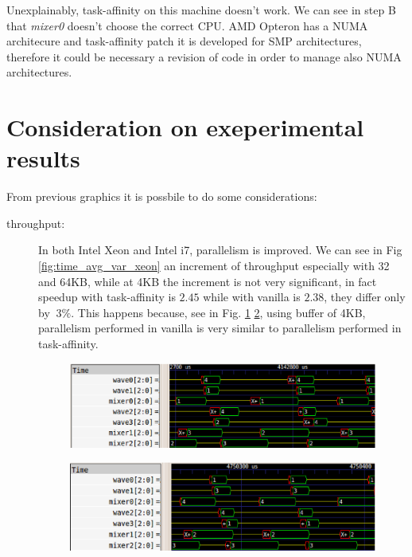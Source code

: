 Unexplainably, task-affinity on this machine doesn't work. We can see in step B that \textit{mixer0} doesn't choose the correct CPU. AMD Opteron has a NUMA 
architecure and task-affinity patch it is developed for SMP architectures, therefore it could be necessary a revision of code in order to manage also 
NUMA architectures.

\section{Consideration on exeperimental results}

From previous graphics it is possbile to do some considerations:

\begin{description}

\item[throughput:] In both Intel Xeon and Intel i7, parallelism is improved. We can see in Fig \ref{fig:time_avg_var_xeon} an increment of throughput 
especially with 32 and 64KB, while at 4KB the increment is not very significant, in fact speedup with task-affinity is $2.45$ while with vanilla is $2.38$, 
they differ only by $~ 3\%$. This happens because, see in Fig. \ref{fig:4KB_xeon_results_taskaff} \ref{fig:4KB_xeon_results_van}, using buffer of 4KB, 
parallelism performed in vanilla is very similar to parallelism performed in task-affinity.

\begin{figure}[htbp]
\centering
\includegraphics[width=\widefigure]{images/results_xeon/4KB_results_xeon_taskaff.eps}
\caption{}
\label{fig:4KB_xeon_results_taskaff}
\end{figure}

\begin{figure}[htbp]
\centering
\includegraphics[width=\widefigure]{images/results_xeon/4KB_results_xeon_van.eps}
\caption{}
\label{fig:4KB_xeon_results_van}
\end{figure}


\end{description}
